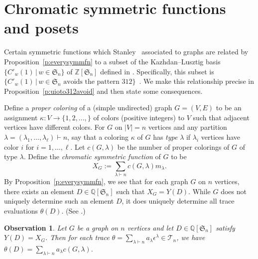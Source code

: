 \documentclass[12pt]{amsart}
\newtheorem{obs}[thm]{Observation}
\numberwithin{equation}{section}
\newcommand{\sn}{\mathfrak{S}_n}
\newcommand{\zsn}{\mathbb{Z}[\sn]}
\newcommand{\qsn}{\mathbb{Q}[\sn]}
\newcommand{\defeq}{:=}
\newcommand{\trspace}[1]{\mathcal{T}_{#1}}
\begin{document}
\section{Chromatic symmetric functions and posets}\label{s:chrom}

Certain symmetric functions which Stanley~\cite{StanSymm}
associated to graphs are related by Proposition~\ref{p:everysymmfn}
to a subset of the Kazhdan--Lusztig basis $\{ C'_w(1) \,|\, w \in \sn \}$
of $\zsn$ defined in \cite{KLRepCH}.
Specifically, this subset is
$\{ C'_w(1) \,|\, w \in \sn \text{ avoids the pattern } 312 \}$~\cite[Thm.\,7.1]{CHSSkanEKL}.
We make this relationship precise in Proposition~\ref{p:uioto312avoid} and then
state some consequences.

Define a {\em proper coloring} of a (simple undirected) graph $G = (V,E)$
to be an assignment $\kappa: V \rightarrow \{1,2,\dotsc, \}$
of colors (positive integers) to $V$
such that adjacent vertices have different colors.
For $G$ on $|V| = n$ vertices and any partition
$\lambda = (\lambda_1,\dotsc,\lambda_\ell) \vdash n$,
say that a coloring $\kappa$ of $G$ has {\em type}
$\lambda$ if $\lambda_i$ vertices have color $i$ for $i = 1,\dotsc, \ell$.
Let $c(G,\lambda)$ be the number of proper colorings of $G$ of type
$\lambda$.
Define the {\em chromatic symmetric function}
of $G$ to be
\begin{equation}\label{eq:chrom}
  X_G \defeq
  \sum_{\lambda \vdash n} c(G,\lambda) m_\lambda.
\end{equation}
By Proposition~\ref{p:everysymmfn},
we see that for each graph $G$ on $n$
vertices, there exists an element $D \in \qsn$ such that $X_G = Y(D)$.
While $G$ does not uniquely determine such an element $D$,
it does uniquely determine all trace evaluations $\theta(D)$.
(See \cite[Obs.\,3.1]{SkanCCS}.)
\begin{obs}\label{o:yyx}
  Let $G$ be a graph on $n$ vertices
  and let $D \in \qsn$ satisfy $Y(D) = X_G$.
  Then for each trace
  $\theta  = \sum_{\lambda \vdash n} a_\lambda \epsilon^\lambda \in \trspace n$,
  we have
  $\theta(D) = \sum_{\lambda \vdash n} a_\lambda c(G,\lambda)$.
\end{obs}
\end{document}
